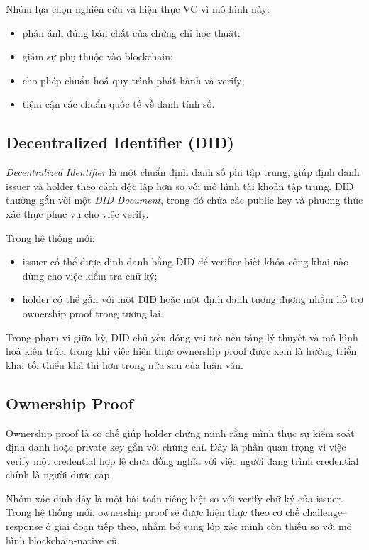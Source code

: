 Nhóm lựa chọn nghiên cứu và hiện thực VC vì mô hình này:
\begin{itemize}
    \item phản ánh đúng bản chất của chứng chỉ học thuật;
    \item giảm sự phụ thuộc vào blockchain;
    \item cho phép chuẩn hoá quy trình phát hành và verify;
    \item tiệm cận các chuẩn quốc tế về danh tính số.
\end{itemize}

\subsection{Decentralized Identifier (DID)}

\textit{Decentralized Identifier} là một chuẩn định danh số phi tập trung, giúp định danh issuer và holder theo cách độc lập hơn so với mô hình tài khoản tập trung. DID thường gắn với một \textit{DID Document}, trong đó chứa các public key và phương thức xác thực phục vụ cho việc verify.

Trong hệ thống mới:
\begin{itemize}
    \item issuer có thể được định danh bằng DID để verifier biết khóa công khai nào dùng cho việc kiểm tra chữ ký;
    \item holder có thể gắn với một DID hoặc một định danh tương đương nhằm hỗ trợ ownership proof trong tương lai.
\end{itemize}

Trong phạm vi giữa kỳ, DID chủ yếu đóng vai trò nền tảng lý thuyết và mô hình hoá kiến trúc, trong khi việc hiện thực ownership proof được xem là hướng triển khai tối thiểu khả thi hơn trong nửa sau của luận văn.

\subsection{Ownership Proof}

Ownership proof là cơ chế giúp holder chứng minh rằng mình thực sự kiểm soát định danh hoặc private key gắn với chứng chỉ. Đây là phần quan trọng vì việc verify một credential hợp lệ chưa đồng nghĩa với việc người đang trình credential chính là người được cấp.

Nhóm xác định đây là một bài toán riêng biệt so với verify chữ ký của issuer. Trong hệ thống mới, ownership proof sẽ được hiện thực theo cơ chế challenge--response ở giai đoạn tiếp theo, nhằm bổ sung lớp xác minh còn thiếu so với mô hình blockchain-native cũ.


